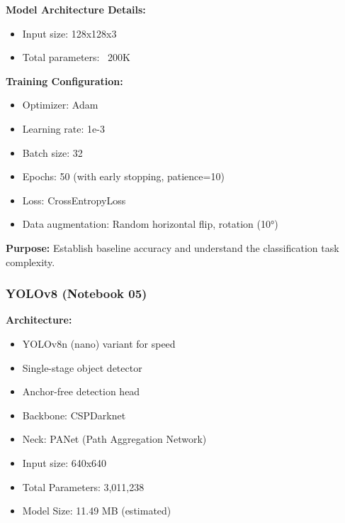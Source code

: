 \documentclass[12pt,a4paper]{article}
\begin{document}
\textbf{Model Architecture Details:}
\begin{itemize}
    \item Input size: 128x128x3
    \item Total parameters: ~200K
\end{itemize}

\textbf{Training Configuration:}
\begin{itemize}
    \item Optimizer: Adam
    \item Learning rate: 1e-3
    \item Batch size: 32
    \item Epochs: 50 (with early stopping, patience=10)
    \item Loss: CrossEntropyLoss
    \item Data augmentation: Random horizontal flip, rotation (10°)
\end{itemize}

\textbf{Purpose:} Establish baseline accuracy and understand the classification task complexity.

\subsubsection{YOLOv8 (Notebook 05)}

\textbf{Architecture:}
\begin{itemize}
    \item YOLOv8n (nano) variant for speed
    \item Single-stage object detector
    \item Anchor-free detection head
    \item Backbone: CSPDarknet
    \item Neck: PANet (Path Aggregation Network)
    \item Input size: 640x640
    \item Total Parameters: 3,011,238
    \item Model Size: 11.49 MB (estimated)
\end{itemize}
\end{document}
